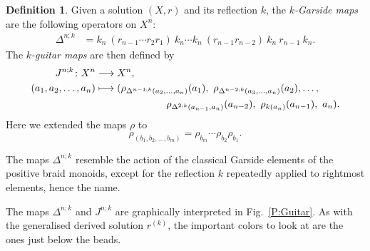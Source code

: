 \documentclass{amsart}
\theoremstyle{plain}
\theoremstyle{definition}
\newtheorem{defn}[thm]{Definition}
\theoremstyle{remark}
\begin{document}
\begin{defn}
Given a solution $(X,r)$ and its reflection $k$, the \emph{$k$-Garside maps} are the following operators on $X^{n}$:
\begin{align*}
\Delta^{n;k} &= k_n\ (r_{n-1}\cdots r_2r_1)\ k_n \cdots k_n \ (r_{n-1}r_{n-2})\ k_n \ r_{n-1}\ k_n.
\end{align*}
 The \emph{$k$-guitar maps} are then defined by
\begin{align*}
J^{n;k} \colon X^{n} & \longrightarrow X^{n},\\
(a_1,a_2,\ldots,a_n) &\longmapsto (\rho_{\Delta^{n-1;k}(a_2,\ldots,a_n)}(a_1), \ \rho_{\Delta^{n-2;k}(a_3,\ldots,a_n)}(a_2),\ldots,\\ 
&\hspace*{2.5cm}\rho_{\Delta^{2;k}(a_{n-1},a_n)}(a_{n-2}),\ \rho_{k(a_n)}(a_{n-1}),\ a_n).
\end{align*}
Here we extended the maps $\rho$ to 
\begin{equation}\label{E:rho_ov_b}
\rho_{(b_1,b_2,\ldots,b_m)} =\rho_{b_m} \cdots \rho_{b_2}\rho_{b_1}.
\end{equation}
\end{defn}

The maps $\Delta^{n;k}$ resemble the action of the classical Garside elements of the positive braid monoids, except for the reflection $k$ repeatedly applied to rightmost elements, hence the name.

The maps $\Delta^{n;k}$ and $J^{n;k}$ are graphically interpreted in Fig.~\ref{P:Guitar}. As with the generalised derived solution $r^{(k)}$, the important colors to look at are the ones just below the beads.
\end{document}
